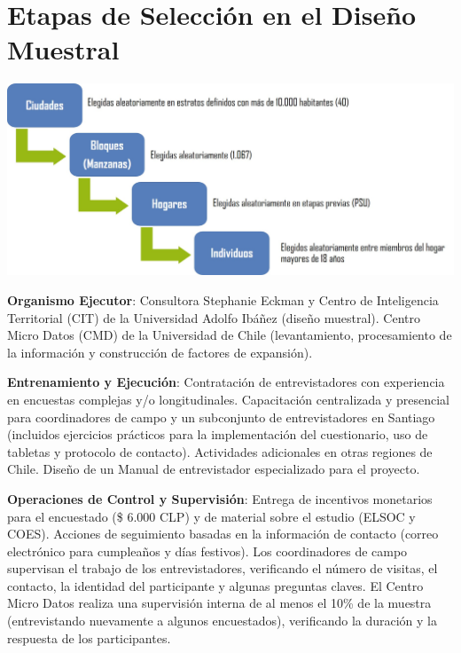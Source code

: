 \documentclass[
  12pt,
]{book}
\begin{document}
\hypertarget{etapas-de-selecciuxf3n-en-el-diseuxf1o-muestral}{%
\chapter{Etapas de Selección en el Diseño Muestral}\label{etapas-de-selecciuxf3n-en-el-diseuxf1o-muestral}}

\begin{center}\includegraphics[width=1.5\linewidth,height=1.5\textheight]{inputs/images/etapas_seleccion} \end{center}

\textbf{Organismo Ejecutor}: Consultora Stephanie Eckman y Centro de Inteligencia Territorial (CIT) de la Universidad Adolfo Ibáñez (diseño muestral). Centro Micro Datos (CMD) de la Universidad de Chile (levantamiento, procesamiento de la información y construcción de factores de expansión).

\textbf{Entrenamiento y Ejecución}: Contratación de entrevistadores con experiencia en encuestas complejas y/o longitudinales. Capacitación centralizada y presencial para coordinadores de campo y un subconjunto de entrevistadores en Santiago (incluidos ejercicios prácticos para la implementación del cuestionario, uso de tabletas y protocolo de contacto). Actividades adicionales en otras regiones de Chile. Diseño de un Manual de entrevistador especializado para el proyecto.

\textbf{Operaciones de Control y Supervisión}: Entrega de incentivos monetarios para el encuestado (\$ 6.000 CLP) y de material sobre el estudio (ELSOC y COES). Acciones de seguimiento basadas en la información de contacto (correo electrónico para cumpleaños y días festivos). Los coordinadores de campo supervisan el trabajo de los entrevistadores, verificando el número de visitas, el contacto, la identidad del participante y algunas preguntas claves. El Centro Micro Datos realiza una supervisión interna de al menos el 10\% de la muestra (entrevistando nuevamente a algunos encuestados), verificando la duración y la respuesta de los participantes.
\end{document}
